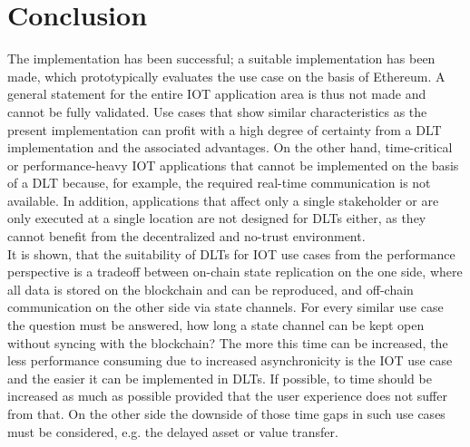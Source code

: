 \documentclass[conference]{IEEEtran}
\begin{document}
\section{Conclusion}
The implementation has been successful; a suitable implementation has been made, which prototypically evaluates the use case on the basis of Ethereum. A general statement for the entire IOT application area is thus not made and cannot be fully validated. Use cases that show similar characteristics as the present implementation can profit with a high degree of certainty from a DLT implementation and the associated advantages. On the other hand, time-critical or performance-heavy IOT applications that cannot be implemented on the basis of a DLT because, for example, the required real-time communication is not available. In addition, applications that affect only a single stakeholder or are only executed at a single location are not designed for DLTs either, as they cannot benefit from the decentralized and no-trust environment.\\
It is shown, that the suitability of DLTs for IOT use cases from the performance perspective is a tradeoff between on-chain state replication on the one side, where all data is stored on the blockchain and can be reproduced, and off-chain communication on the other side via state channels. For every similar use case the question must be answered, how long a state channel can be kept open without syncing with the blockchain? The more this time can be increased, the less performance consuming due to increased asynchronicity is the IOT use case and the easier it can be implemented in DLTs. If possible, to time should be increased as much as possible provided that the user experience does not suffer from that. On the other side the downside of those time gaps in such use cases must be considered, e.g. the delayed asset or value transfer. 
\end{document}
